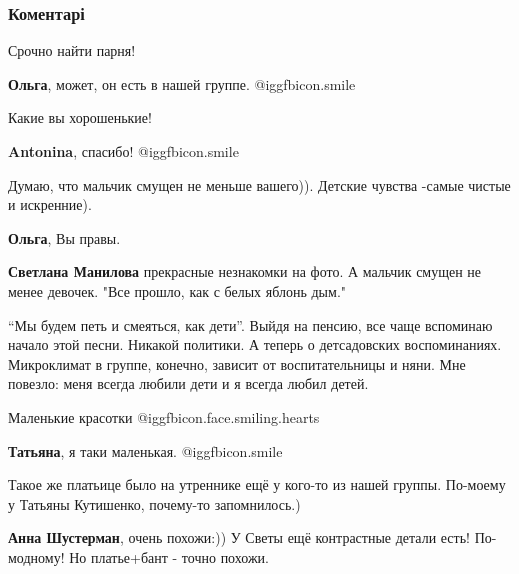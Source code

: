  
 
 
 
 
\subsubsection{Коментарі}

\begin{itemize} %
Срочно найти парня!

\textbf{Ольга}, может, он есть в нашей группе. @igg{fbicon.smile} 

Какие вы хорошенькие!

\textbf{Antonina}, спасибо! @igg{fbicon.smile} 

Думаю, что мальчик смущен не меньше вашего)). Детские чувства -самые чистые и искренние).

\begin{itemize} %
\textbf{Ольга}, Вы правы.

\textbf{Светлана Манилова} прекрасные незнакомки на фото. А мальчик смущен не менее девочек. "Все прошло, как с белых яблонь дым."
\end{itemize} %


\enquote{Мы будем петь и смеяться, как дети}. Выйдя на пенсию, все чаще вспоминаю
начало этой песни. Никакой политики. А теперь о детсадовских воспоминаниях.
Микроклимат в группе, конечно, зависит от воспитательницы и няни. Мне повезло:
меня всегда любили дети и я всегда любил детей.

Маленькие красотки @igg{fbicon.face.smiling.hearts} 

\textbf{Татьяна}, я таки маленькая. @igg{fbicon.smile} 

Такое же платьице было на утреннике ещё у кого-то из нашей группы. По-моему у
Татьяны Кутишенко, почему-то запомнилось.)

\begin{itemize} %
\textbf{Анна Шустерман}, очень похожи:))
У Светы ещё контрастные детали есть!
По-модному!
Но платье+бант - точно похожи.


\end{itemize}
\end{itemize}
